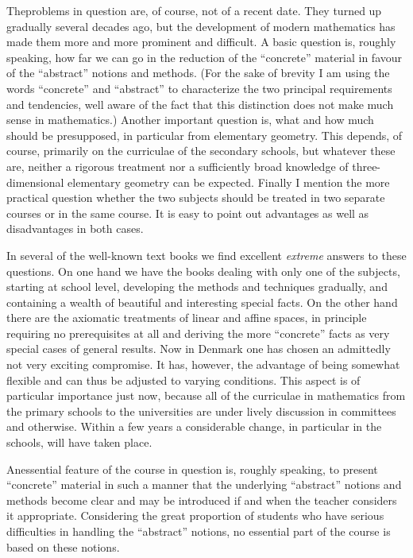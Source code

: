 The\pageoriginale problems in question are, of course, not of a recent
date. They turned up gradually several decades ago, but the
development of modern mathematics has made them more and more
prominent and difficult. A basic question is, roughly speaking, how
far we can go in the reduction of the ``concrete'' material in favour
of the ``abstract'' notions and methods. (For the sake of brevity I am
using the words ``concrete'' and ``abstract'' to characterize the two
principal requirements and tendencies, well aware of the fact that
this distinction does not make much sense in mathematics.) Another
important question is, what and how much should be presupposed, in
particular from elementary geometry. This depends, of course,
primarily on the curriculae of the secondary schools, but whatever
these are, neither a rigorous treatment nor a sufficiently broad
knowledge of three-dimensional elementary geometry can be
expected. Finally I mention the more practical question whether the
two subjects should be treated in two separate courses or in the same
course. It is easy to point out advantages as well as disadvantages
in both cases.

In several of the well-known text books we find excellent
\textit{extreme} answers to these questions. On one hand we have the
books dealing with only one of the subjects, starting at school level,
developing the methods and techniques gradually, and containing a
wealth of beautiful and interesting special facts. On the other hand
there are the axiomatic treatments of linear and affine spaces, in
principle requiring no prerequisites at all and deriving the more
``concrete'' facts as very special cases of general results. Now in
Denmark one has chosen an admittedly not very exciting compromise. It
has, however, the advantage of being somewhat flexible and can thus be
adjusted to varying conditions. This aspect is of particular
importance just now, because all of the curriculae in mathematics from
the primary schools to the universities are under lively discussion in
committees and otherwise. Within a few years a considerable change, in
particular in the schools, will have taken place.

An\pageoriginale essential feature of the course in question is,
roughly speaking, to present ``concrete'' material in such a manner
that the underlying ``abstract'' notions and methods become clear and
may be introduced if and when the teacher considers it
appropriate. Considering the great proportion of students who have
serious difficulties in handling the ``abstract'' notions, no
essential part of the course is based on these notions.

